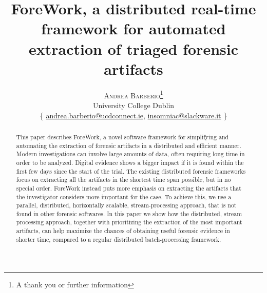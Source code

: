 \documentclass[twoside]{article}
\title{\vspace{-15mm}\fontsize{24pt}{10pt}\selectfont\textbf{ForeWork,
    a distributed real-time framework for automated extraction of
    triaged forensic artifacts}} %
\author{\large
\textsc{Andrea Barberio}\thanks{A thank you or further information}\\[2mm] %
\normalsize University College Dublin \\ %
\normalsize
    \{
        \href{mailto:andrea.barberio@ucdconnect.ie}{andrea.barberio@ucdconnect.ie},
        \href{mailto:insomniac@slackware.it}{insomniac@slackware.it}
    \}
\vspace{-5mm}
}
\date{}
\begin{document}
\maketitle %

\thispagestyle{fancy} %


\begin{abstract}

\noindent
    This paper describes ForeWork, a novel software framework for
    simplifying and automating the extraction of forensic artifacts in a
    distributed and efficient manner.
    Modern investigations can involve large amounts of data, often requiring
    long time in order to be analyzed.
    Digital evidence shows a bigger impact if it is found within the first few
    days since the start of the trial.
    The existing distributed forensic frameworks focus on extracting all the artifacts
    in the shortest time span possible, but in no special order.
    ForeWork instead puts more emphasis on extracting the artifacts that the
    investigator considers more important for the case.
    To achieve this, we use a parallel, distributed, horizontally
    scalable, stream-processing  approach, that is not found in other forensic
    softwares.
    In this paper we show how the distributed, stream processing approach,
    together with prioritizing the extraction of the most important artifacts,
    can help maximize the chances of obtaining useful forensic evidence in
    shorter time, compared to a regular distributed batch-processing framework.

\end{abstract}
\end{document}
